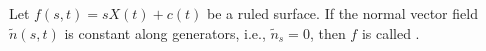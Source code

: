 Let $f(s, t) = s X(t) + c(t)$ be a ruled surface. If the normal vector field $\tilde{n}(s, t)$ is constant along generators, i.e., $\tilde{n}_s = 0$, then $f$ is called .
